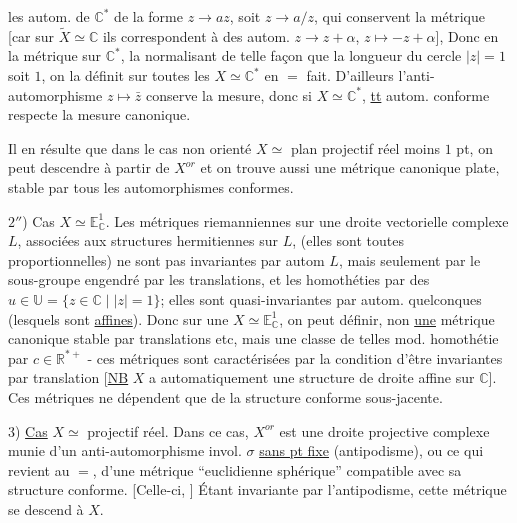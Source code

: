  les autom. de $\mathbb C^*$  de la forme $z\longrightarrow az$, soit $z\longrightarrow a/z$, qui conservent la métrique [car sur $\widetilde X\simeq\mathbb C$ ils correspondent à des autom. $z\longrightarrow z+\alpha$, $z\longmapsto-z+\alpha$], Donc en  la métrique sur $\mathbb C^*$, 
 la normalisant de telle façon que la longueur du cercle $|z|=1$ soit \deleted{$2\pi$} $1$, on la définit sur toutes les $X\simeq\mathbb C^*$ en $=$ fait. D'ailleurs l'anti-automorphisme $z\longmapsto\bar z$  conserve la mesure, donc si $X\simeq\mathbb C^*$, \uline{tt} autom. conforme respecte la mesure canonique.


Il en résulte que dans le cas non orienté $X\simeq$ plan projectif réel moins $1$ pt, on peut descendre à partir de $X^{or}$ et on trouve aussi une métrique canonique plate, stable par tous les automorphismes conformes.

$2''$) Cas $X\simeq\mathbb E^1_{\mathbb C}$. Les métriques riemanniennes sur une  droite vectorielle complexe $L$, associées aux structures hermitiennes sur $L$, (elles sont toutes proportionnelles) ne sont pas invariantes par autom  $L$, mais seulement par le sous-groupe engendré par les translations, et les  homothéties par des $u\in\mathbb U=\{z\in\mathbb C\mid |z|=1\}$; elles sont quasi-invariantes par autom. quelconques (lesquels sont \uline{affines}). Donc sur une $X\simeq\mathbb E^1_{\mathbb C}$, on peut définir, non \uline{une} métrique
canonique stable par translations etc, mais une classe de telles mod. homothétie par $c\in\mathbb R^{*+}$ - ces métriques sont caractérisées par la condition d'être invariantes par translation [\uline{NB} $X$ a automatiquement une structure de droite affine sur $\mathbb C$]. Ces métriques  ne dépendent que de la structure conforme sous-jacente.

3) \uline{Cas}  $X\simeq$  projectif réel. Dans ce   cas, $X^{or}$ est une droite projective complexe munie d'un anti-automorphisme invol. $\sigma$ \uline{sans pt fixe} (antipodisme), ou ce qui revient au $=$, d'une métrique ``euclidienne sphérique'' compatible avec sa structure conforme. [Celle-ci,  ] Étant invariante par l'antipodisme, cette métrique se descend à $X$.


